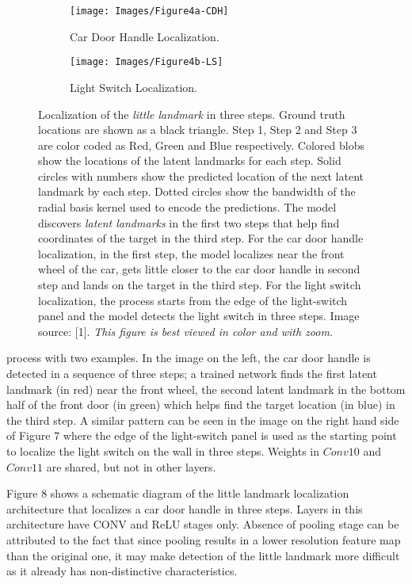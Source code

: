 \documentclass [11pt,letterpaper ,twoside ,openany ]{report}
\begin{document}
    \begin{figure}[h!]
    \centering
        \begin{subfigure}[b]{0.45\linewidth}
            \texttt{[image: Images/Figure4a-CDH]}
            \caption{Car Door Handle Localization.}
        \end{subfigure}
        \begin{subfigure}[b]{0.45\linewidth}
            \texttt{[image: Images/Figure4b-LS]}
            \caption{Light Switch Localization.}
        \end{subfigure}
        \caption{Localization of the \textit{little landmark} in three steps. Ground truth locations are shown as a black triangle. Step 1, Step 2 and Step 3 are color coded as Red, Green and Blue respectively. Colored blobs show the locations of the latent landmarks for each step. Solid circles with numbers show the predicted location of the next latent landmark by each step. Dotted circles show the bandwidth of the radial basis kernel used to encode the predictions. The model discovers \textit{latent landmarks} in the first two steps that help find coordinates of the target in the third step. For the car door handle localization, in the first step, the model localizes near the front wheel of the car, gets little closer to the car door handle in second step and lands on the target in the third step. For the light switch localization, the process starts from the edge of the light-switch panel and the model detects the light switch in three steps. Image source: [1]. \textit{This figure is best viewed in color and with zoom.}}
        \label{fig:localization}
    \end{figure}

    \noindent
    process with two examples. In the image on the left, the car door handle is detected in a sequence of three steps; a trained network finds the first latent landmark (in red) near the front wheel, the second latent landmark in the bottom half of the front door (in green) which helps find the target location (in blue) in the third step. A similar pattern can be seen in the image on the right hand side of Figure 7 where the edge of the light-switch panel is used as the starting point to localize the light switch on the wall in three steps. Weights in \(Conv10\) and \(Conv11\) are shared, but not in other layers. 

    Figure 8 shows a schematic diagram of the little landmark localization architecture that localizes a car door handle in three steps. Layers in this architecture have CONV and ReLU stages only. Absence of pooling stage can be attributed to the fact that since pooling results in a lower resolution feature map than the original one, it may make detection of the little landmark more difficult as it already has non-distinctive characteristics. 
\end{document}
